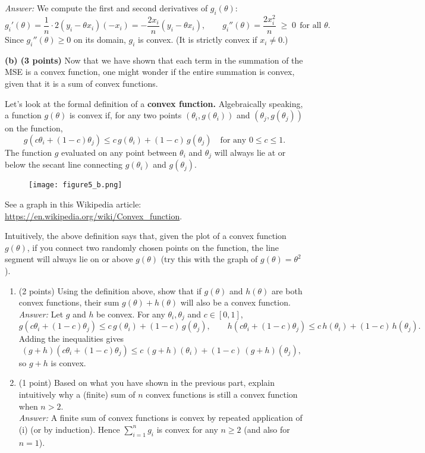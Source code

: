 \documentclass[11pt]{article}
\begin{document}
\medskip
\noindent\textit{Answer:} We compute the first and second derivatives of $g_i(\theta)$:
\[
g_i'(\theta)=\frac{1}{n}\cdot 2(y_i-\theta x_i)(-x_i)
=-\frac{2x_i}{n}(y_i-\theta x_i),
\qquad
g_i''(\theta)=\frac{2x_i^2}{n}\;\ge\;0\ \ \text{for all }\theta.
\]
Since $g_i''(\theta)\ge0$ on its domain, $g_i$ is convex. (It is strictly convex if $x_i\neq0$.)

\bigskip
\noindent\textbf{(b) (3 points)} Now that we have shown that each term in the summation of the MSE is a convex function, one might wonder if the entire summation is convex, given that it is a sum of convex functions.

\smallskip
\noindent Let’s look at the formal definition of a \textbf{convex function.} Algebraically speaking, a function $g(\theta)$ is convex if, for any two points $(\theta_i,g(\theta_i))$ and $(\theta_j,g(\theta_j))$ on the function,
\[
g(c\theta_i+(1-c)\theta_j)\le c\,g(\theta_i)+(1-c)\,g(\theta_j)
\quad\text{for any } 0\le c\le 1.
\]
The function $g$ evaluated on any point between $\theta_i$ and $\theta_j$ will always lie at or below the secant line connecting $g(\theta_i)$ and $g(\theta_j)$.
\begin{figure}[h!]
    \centering
    \texttt{[image: figure5\_b.png]}
\end{figure}
\medskip

See a graph in this Wikipedia article: \url{https://en.wikipedia.org/wiki/Convex_function}.

\smallskip
Intuitively, the above definition says that, given the plot of a convex function $g(\theta)$, if you connect two randomly chosen points on the function, the line segment will always lie on or above $g(\theta)$ (try this with the graph of $g(\theta)=\theta^2$).

\begin{enumerate}[label=\roman*.]
    \item (2 points) Using the definition above, show that if $g(\theta)$ and $h(\theta)$ are both convex functions, their sum $g(\theta)+h(\theta)$ will also be a convex function.
    \medskip\\
    \noindent\textit{Answer:} Let $g$ and $h$ be convex. For any $\theta_i,\theta_j$ and $c\in[0,1]$,
        \[
        g\!\left(c\theta_i+(1-c)\theta_j\right)
        \le c\,g(\theta_i)+(1-c)\,g(\theta_j),
        \qquad
        h\!\left(c\theta_i+(1-c)\theta_j\right)
        \le c\,h(\theta_i)+(1-c)\,h(\theta_j).
        \]
        Adding the inequalities gives
        \[
        (g+h)\!\left(c\theta_i+(1-c)\theta_j\right)
        \le c\,(g+h)(\theta_i)+(1-c)\,(g+h)(\theta_j),
        \]
        so $g+h$ is convex.

    \item (1 point) Based on what you have shown in the previous part, explain intuitively why a (finite) sum of $n$ convex functions is still a convex function when $n>2$.
    \medskip\\
    \noindent\textit{Answer:} A finite sum of convex functions is convex by repeated application of (i) (or by induction). Hence $\sum_{i=1}^n g_i$ is convex for any $n\ge2$ (and also for $n=1$).
\end{enumerate}
\end{document}
